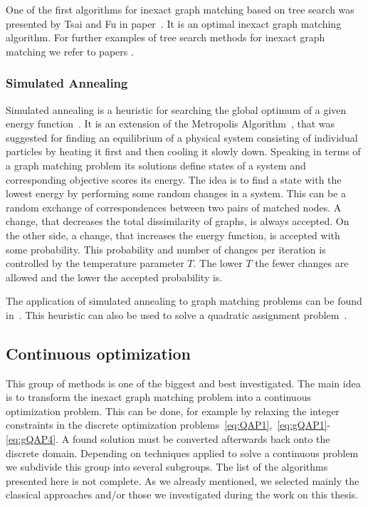 One of the first algorithms for inexact graph matching based on tree search was presented by Tsai and Fu in paper~\cite{Fu1979}. It is an optimal inexact graph matching algorithm. For further examples of tree search methods for inexact graph matching we refer to papers \cite{Bunke1983_inexactGM,Shapiro1981,Wang1995}.
\subsubsection{Simulated Annealing}
Simulated annealing is a heuristic for searching the global optimum of a given energy function~\cite{Burkard98thequadratic}. It is an extension of the Metropolis Algorithm~\cite{Metropolis}, that was suggested for finding an equilibrium of a physical system consisting of individual particles by heating it first and then cooling it slowly down. Speaking in terms of a graph matching problem its solutions define states of a system and corresponding objective scores its energy. The idea is to find a state with the lowest energy by performing some random changes in a system. This can be a random exchange of correspondences between two pairs of matched nodes. A change, that decreases the total dissimilarity of graphs, is always accepted. On the other side, a change, that increases the energy function, is accepted with some probability. This probability and number of changes per iteration is controlled by the temperature parameter $T$. The lower $T$ the fewer changes are allowed and the lower the accepted probability is. 

The application of simulated annealing to graph matching problems can be found in~\cite{Herault1990_SimulatedAnnealing}. This heuristic can also be used to solve a quadratic assignment problem~\cite{Burkard98thequadratic}.
\subsection{Continuous optimization}
This group of methods is one of the biggest and best investigated. The main idea is to transform the inexact graph matching problem into a continuous optimization problem. This can be done, for example by relaxing the integer constraints in the discrete optimization problems~\eqref{eq:QAP1},~\eqref{eq:gQAP1}-\eqref{eq:gQAP4}. A found solution must be converted afterwards back onto the discrete domain. Depending on techniques applied to solve a continuous problem we subdivide this group into several subgroups. The list of the algorithms presented here is not complete. As we already mentioned, we selected mainly the classical approaches and/or those we investigated during the work on this thesis.

